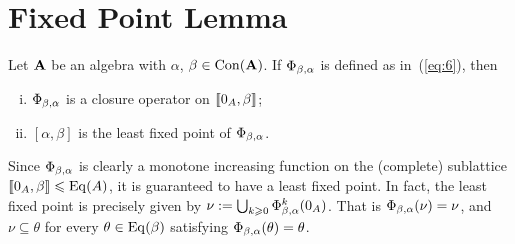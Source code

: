 \section{Fixed Point Lemma}
\begin{lemma}
  \label{lem:fixed-point-comm}
  Let $\mathbf{A}$ be an algebra with $\alpha$, $\beta\in \operatorname{Con}(\mathbf{A})$.
  If
  $\Phi_{\beta, \alpha}$ is defined as in~(\ref{eq:6}), then
  \begin{enumerate}[(i)]
  \item \label{item:1} $\Phi_{\beta, \alpha}$ is a closure operator on %
    $\llbracket 0_A, \beta\rrbracket$;
  \item \label{item:2} $[\alpha, \beta]$ is the least fixed point of $\Phi_{\beta, \alpha}$.
  \end{enumerate}
\end{lemma}
\begin{remark}
  Since $\Phi_{\beta, \alpha}$ is clearly a monotone increasing function on the (complete) sublattice
  $\llbracket 0_A, \beta\rrbracket \leqslant \operatorname{Eq}(A)$, it is guaranteed to have a least fixed point.  In fact,
  the least fixed point is precisely given by 
  $\nu := \bigcup_{k\geqslant 0} \Phi_{\beta, \alpha}^{k}(0_A)$.
  That is $\Phi_{\beta, \alpha}(\nu) = \nu$,
  and $\nu \subseteq \theta$ for every $\theta\in \operatorname{Eq}(\beta)$
  satisfying $\Phi_{\beta, \alpha}(\theta) = \theta$.
   
\end{remark}

